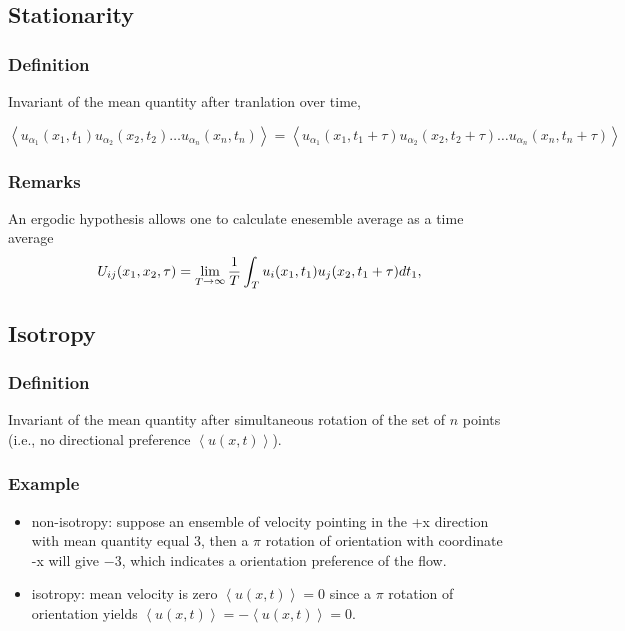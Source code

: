 \subsection{Stationarity} 
\subsubsection{Definition} Invariant of the mean quantity after tranlation over time,

\begin{equation}
   \left< u_{\alpha_1}(x_1,t_1) u_{\alpha_2}(x_2,t_2) \dotsc u_{\alpha_n}(x_n,t_n) \right> = \left< u_{\alpha_1}(x_1,t_1+\tau) u_{\alpha_2}(x_2,t_2+\tau) \dotsc u_{\alpha_n}(x_n,t_n+\tau) \right>
\end{equation}

\subsubsection{Remarks} An ergodic hypothesis allows one to calculate enesemble average as a time average
         \begin{equation}
            U_{ij}(x_1,x_2,\tau) = \lim_{\substack T \rightarrow \infty} \frac{1}{T}\int_T u_i(x_1,t_1)u_j(x_2,t_1+\tau) dt_1,
         \end{equation}


\subsection{Isotropy}
\subsubsection{Definition} Invariant of the mean quantity after simultaneous rotation of the set of $n$ points (i.e., no directional preference $\left< u(x,t) \right>$).

\subsubsection{Example}
\begin{itemize}
   \item non-isotropy: suppose an ensemble of velocity pointing in the +x direction with mean quantity equal $3$, then a $\pi$ rotation of orientation with coordinate -x will give $-3$, which indicates a orientation preference of the flow. 
   \item isotropy: mean velocity is zero $\left< u(x,t) \right> = 0$ since a $\pi$ rotation of orientation yields $\left< u(x,t) \right> = -\left< u(x,t) \right> = 0$.
\end{itemize}




